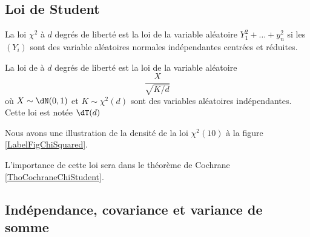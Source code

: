 \subsection{Loi de Student}

\begin{definition}
    La loi \( \chi^2\) à \( d\) degrés de liberté est la loi de la variable aléatoire \( Y_1^2+\ldots+y_n^2\) si les \( (Y_i)\) sont des variable aléatoires normales indépendantes centrées et réduites.

    La loi de  à \( d\) degrés de liberté est la loi de la variable aléatoire
    \begin{equation}
        \frac{ X }{ \sqrt{K/d} }
    \end{equation}
    où \( X\sim\dN(0,1)\) et \( K\sim\chi^2(d)\) sont des variables aléatoires indépendantes. Cette loi est notée \( \dT(d)\)
\end{definition}

Nous avons une illustration de la densité de la loi \( \chi^2(10)\) à la figure \ref{LabelFigChiSquared}.
\newcommand{\CaptionFigChiSquared}{La densité de $\chi^2(10)$.}


L'importance de cette loi sera dans le théorème de Cochrane \ref{ThoCochraneChiStudent}.

\subsection{Indépendance, covariance et variance de somme}
\label{subsecTTHohur}


